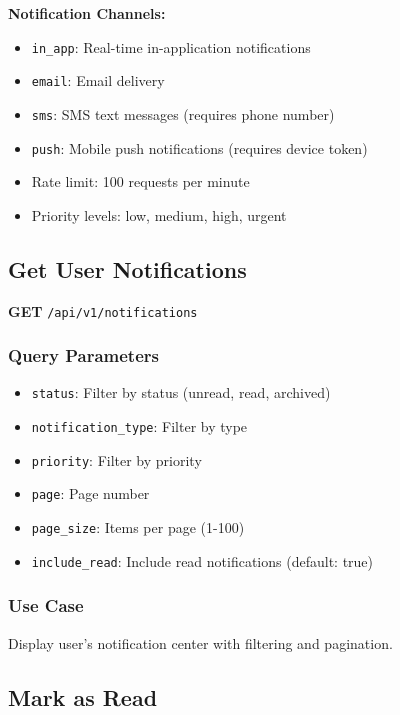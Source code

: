 \documentclass[11pt,a4paper]{report}
\begin{document}
\begin{infobox}
\textbf{Notification Channels:}
\begin{itemize}[leftmargin=*]
    \item \texttt{in\_app}: Real-time in-application notifications
    \item \texttt{email}: Email delivery
    \item \texttt{sms}: SMS text messages (requires phone number)
    \item \texttt{push}: Mobile push notifications (requires device token)
    \item Rate limit: 100 requests per minute
    \item Priority levels: low, medium, high, urgent
\end{itemize}
\end{infobox}

\subsection{Get User Notifications}

\textbf{GET} \texttt{/api/v1/notifications}

\subsubsection{Query Parameters}
\begin{itemize}[leftmargin=*]
    \item \texttt{status}: Filter by status (unread, read, archived)
    \item \texttt{notification\_type}: Filter by type
    \item \texttt{priority}: Filter by priority
    \item \texttt{page}: Page number
    \item \texttt{page\_size}: Items per page (1-100)
    \item \texttt{include\_read}: Include read notifications (default: true)
\end{itemize}

\subsubsection{Use Case}
Display user's notification center with filtering and pagination.

\subsection{Mark as Read}
\end{document}
